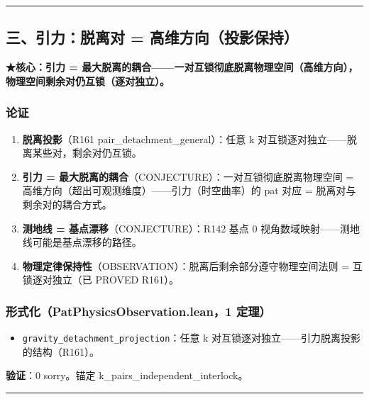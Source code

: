 \documentclass[
]{article}
\providecommand{\tightlist}{%
 \setlength{\itemsep}{0pt}\setlength{\parskip}{0pt}}
\begin{document}
\begin{center}\rule{0.5\linewidth}{0.5pt}\end{center}

\subsection{三、引力：脱离对 =
高维方向（投影保持）}\label{ux4e09ux5f15ux529bux8131ux79bbux5bf9-ux9ad8ux7ef4ux65b9ux5411ux6295ux5f71ux4fddux6301}

\textbf{★核心：引力 =
最大脱离的耦合------一对互锁彻底脱离物理空间（高维方向），物理空间剩余对仍互锁（逐对独立）。}

\subsubsection{论证}\label{ux8bbaux8bc1-2}

\begin{enumerate}
\def\labelenumi{\arabic{enumi}.}
\tightlist
\item
 \textbf{脱离投影}（R161 pair\_detachment\_general）：任意 k
 对互锁逐对独立------脱离某些对，剩余对仍互锁。
\item
 \textbf{引力 = 最大脱离的耦合}（CONJECTURE）：一对互锁彻底脱离物理空间
 = 高维方向（超出可观测维度）------引力（时空曲率）的 pat 对应 =
 脱离对与剩余对的耦合方式。
\item
 \textbf{测地线 = 基点漂移}（CONJECTURE）：R142 基点 0
 视角数域映射------测地线可能是基点漂移的路径。
\item
 \textbf{物理定律保持性}（OBSERVATION）：脱离后剩余部分遵守物理空间法则
 = 互锁逐对独立（已 PROVED R161）。
\end{enumerate}

\subsubsection{形式化（PatPhysicsObservation.lean，1
定理）}\label{ux5f62ux5f0fux5316patphysicsobservation.lean1-ux5b9aux7406-1}

\begin{itemize}
\tightlist
\item
 \texttt{gravity\_detachment\_projection}：任意 k
 对互锁逐对独立------引力脱离投影的结构（R161）。
\end{itemize}

\textbf{验证}：0 sorry。锚定 k\_pairs\_independent\_interlock。

\begin{center}\rule{0.5\linewidth}{0.5pt}\end{center}
\end{document}
